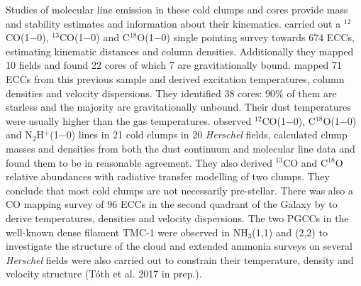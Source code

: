 \documentclass[printer]{aa}
\begin{document}
Studies of molecular line emission in these cold clumps and cores provide mass and stability estimates and information about their kinematics. \citet{wu2012} carried out a $^{12}$CO(1$-$0), $^{13}$CO(1$-$0) and C$^{18}$O(1$-$0) single pointing survey towards 674 ECCs, estimating kinematic distances and column densities. Additionally they mapped 10 fields and found 22 cores of which 7 are gravitationally bound. \citet{meng2013} mapped 71 ECCs from this previous sample and derived excitation temperatures, column densities and velocity dispersions. They identified 38 cores: 90\% of them are starless and the majority are gravitationally unbound. Their dust temperatures were usually higher than the gas temperatures. \citet{parikka2015} observed $^{12}$CO(1$-$0), C$^{18}$O(1$-$0) and N$_2$H$^+$(1$-$0) lines in 21 cold clumps in 20 \textit{Herschel} fields, calculated clump masses and densities from both the dust continuum and molecular line data and found them to be in reasonable agreement. They also derived $^{13}$CO and C$^{18}$O relative abundances with radiative transfer modelling of two clumps. They conclude that most cold clumps are not necessarily pre-stellar. There was also a CO mapping survey of 96 ECCs in the second quadrant of the Galaxy by \citet{zhang2016} to derive temperatures, densities and velocity dispersions. The two PGCCs in the well-known dense filament TMC-1 were observed in NH$_3$(1,1) and (2,2) to investigate the structure of the cloud \citep{feher2016} and extended ammonia surveys on several \textit{Herschel} fields were also carried out to constrain their temperature, density and velocity structure (Tóth et al. 2017 in prep.).
\end{document}
